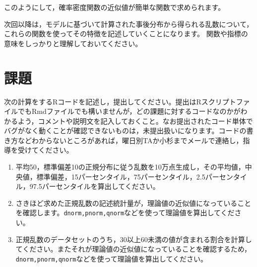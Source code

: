 \documentclass{ltjsbook}
\begin{document}
このようにして，確率密度関数の近似値が簡単な関数で求められます。

次回以降は，モデルに基づいて計算された事後分布から得られる乱数について，これらの関数を使ってその特徴を記述していくことになります。
関数や指標の意味をしっかりと理解しておいてください。
\section{課題}
次の計算をするRコードを記述し，提出してください。提出はRスクリプトファイルでもRmdファイルでも構いませんが，どの課題に対するコードなのかがわかるよう，コメントや説明文を記入しておくこと。なお提出されたコード単体でバグがなく動くことが確認できないものは，未提出扱いになります。コードの書き方などわからないところがあれば，曜日別TAか小杉までメールで連絡し，指導を受けてください。
\begin{enumerate}
  \item 平均50，標準偏差10の正規分布に従う乱数を10万点生成し，その平均値，中央値，標準偏差，15パーセンタイル，75パーセンタイル，2.5パーセンタイル，97.5パーセンタイルを算出してください。
  \item さきほど求めた正規乱数の記述統計量が，理論値の近似値になっていることを確認します。\texttt{dnorm,pnorm,qnorm}などを使って理論値を算出してください。
  \item 正規乱数のデータセットのうち，30以上60未満の値が含まれる割合を計算してください。またそれが理論値の近似値になっていることを確認するため，\texttt{dnorm,pnorm,qnorm}などを使って理論値を算出してください。
\end{enumerate}
\end{document}
